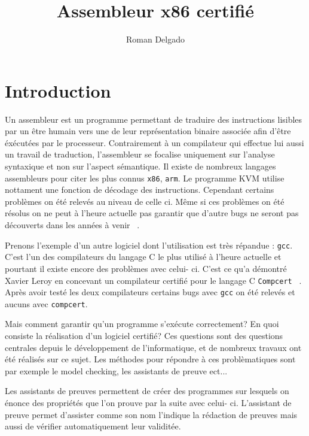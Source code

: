 \documentclass {article}
\title{Assembleur x86 certifié}
\author{Roman Delgado}
\date{}
\theoremstyle{definition}
\theoremstyle{remark}
\newcommand{\fun}[1]{\lstinline!#1!}
\begin{document}
\maketitle



\vfill
\setcounter{tocdepth}{2}
\tableofcontents
\vfill


\section{Introduction}



Un assembleur est un programme permettant de traduire des instructions lisibles par un être humain vers
une de leur représentation binaire associée afin d'être éxécutées par le processeur. Contrairement à un compilateur
qui effectue lui aussi un travail de traduction, l'assembleur se focalise uniquement sur l'analyse syntaxique
et non sur l'aspect sémantique.
Il existe de nombreux langages 
assembleurs pour citer les plus connus \fun{x86}, \fun{arm}.
Le programme KVM
utilise nottament une fonction de décodage des instructions.
Cependant certains problèmes on été relevés au niveau de celle ci.
Même si ces problèmes on été résolus on ne peut à l'heure actuelle pas garantir que d'autre bugs ne seront pas
découverts dans les années à venir ~\citep{Amit:2015:VCV:2815400.2815420}.

Prenons l'exemple d'un autre logiciel dont l'utilisation est très répandue : \fun{gcc}. C'est l'un des compilateurs
du langage C le plus utilisé à l'heure actuelle et pourtant il existe encore des
problèmes avec celui- ci. C'est ce qu'a démontré Xavier Leroy en concevant un compilateur certifié pour le langage C \fun{Compcert}
~\citep{Leroy14thecompcert}. 
Après avoir testé les deux compilateurs certains bugs avec \fun{gcc} on été relevés et aucuns avec \fun{compcert}.


Mais comment garantir qu'un programme s'exécute correctement? En quoi consiste la réalisation d'un logiciel certifié?
Ces questions sont des questions centrales depuis le développement de l'informatique, et de nombreux travaux ont été
réalisés sur ce sujet. Les méthodes pour répondre à ces problèmatiques sont par exemple le model checking, les assistants
de preuve ect...


Les assistants de preuves permettent de créer des programmes sur lesquels on énonce des propriétés que l'on prouve par
la suite avec celui- ci. L'assistant de preuve permet d'assister comme son nom l'indique la rédaction de preuves mais
aussi de vérifier automatiquement leur validitée.
\end{document}
